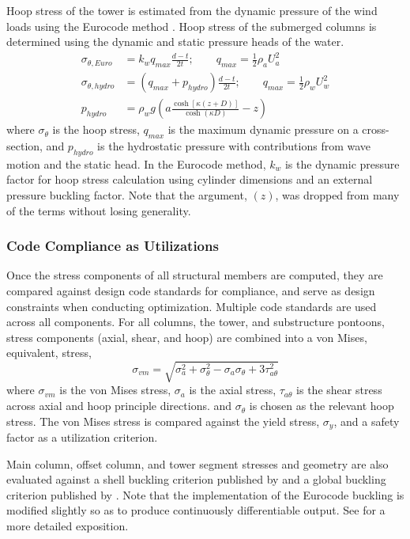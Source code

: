 Hoop stress of the tower is estimated from the dynamic pressure of the
wind loads using the Eurocode method \citep{Eurocode}.  Hoop stress of the submerged
columns is determined using the dynamic and static pressure heads of the
water.
\begin{align}
  \sigma_{\theta,Euro} &= k_w q_{max} \frac{d-t}{2t};\qquad q_{max} =
                         \frac{1}{2}\rho_a U_a^2\\
  \sigma_{\theta,hydro} &= \left(q_{max}+p_{hydro}\right) \frac{d-t}{2t};\qquad q_{max} =
                          \frac{1}{2}\rho_w U_w^2\\
  p_{hydro} &= \rho_w g \left( a\frac{\cosh\left[\kappa\left(z + D \right)\right]}{\cosh\left(\kappa D\right)} - z\right)
\end{align}
where $\sigma_{\theta}$ is the hoop stress, $q_{max}$ is the maximum
dynamic pressure on a cross-section, and $p_{hydro}$ is the hydrostatic
pressure with contributions from wave motion and the static head.  In
the Eurocode method, $k_w$ is the dynamic pressure factor for hoop
stress calculation using cylinder dimensions and an external pressure
buckling factor.  Note that the argument, $(z)$, was dropped from many
of the terms without losing generality.



\subsubsection{Code Compliance as Utilizations}
Once the stress components of all structural members are computed, they
are compared against design code standards for compliance, and serve as
design constraints when conducting optimization.  Multiple code
standards are used across all components.  For all columns, the tower,
and substructure pontoons, stress components (axial, shear, and hoop)
are combined into a von Mises, equivalent, stress,
\begin{equation}
  \sigma_{vm} = \sqrt{\sigma_a^2 + \sigma_{\theta}^2 -
    \sigma_a\sigma_{\theta} + 3\tau_{a\theta}^2}
\end{equation}
where $\sigma_{vm}$ is the von Mises stress, $\sigma_a$ is the axial
stress, $\tau_{a\theta}$ is the shear stress across axial and hoop
principle directions.  and $\sigma_{\theta}$ is chosen as the relevant
hoop stress.  The von Mises stress is compared against the yield stress,
$\sigma_y$, and a safety factor as a utilization criterion.

Main column, offset column, and tower segment stresses and geometry are
also evaluated against a shell buckling criterion published by
\citet{Eurocode} and a global buckling criterion published by
\citet{Germanischer}.  Note that the implementation of the Eurocode
buckling is modified slightly so as to produce continuously
differentiable output.  See \citet{JacketSE} for a more detailed
exposition.

